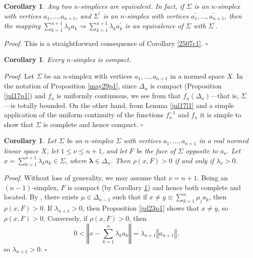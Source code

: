 \documentclass[11pt]{article}%
\newtheorem{corollary}[theorem]{Corollary}
\newenvironment{proof}[1][Proof]{\noindent\textit{#1.} }{}
\begin{document}
\begin{corollary}
\label{may30c1}Any two $n$-simplices are equivalent. In fact, if $\Sigma$ is
an $n$-simplex with vertices $a_{1},\ldots.a_{n+1}$, and $\Sigma^{\prime}$ is
an $n$-simplex with vertices $a_{1}^{\prime},\ldots,a_{n+1}^{\prime}$, then
the mapping $\sum_{k=1}^{n+1}\lambda_{k}a_{k}\rightsquigarrow\sum_{k=1}%
^{n+1}\lambda_{k}a_{k}^{\prime}$ is an equivalence of $\Sigma$ with
$\Sigma^{\prime}$.
\end{corollary}

\begin{proof}
This is a straightforward consequence of Corollary \ref{2507c1}\emph{.}%
\hfill
$\square$
\end{proof}

\begin{corollary}
\label{jul17c1}Every $n$-simplex is compact.
\end{corollary}

\begin{proof}
Let $\Sigma$ be an $n$-simplex with vertices $a_{1},\ldots,a_{n+1}$ in a
normed space $X$. In the notation of Proposition \ref{may29p1}, since
$\Delta_{n}$ is compact (Proposition \ref{jul17p1}) and $f_{n}$ is uniformly
continuous, we see from \cite[2.2.6]{BVtech} that $f_{n}(\Delta_{n})$---that
is, $\Sigma$---is totally bounded. On the other hand, from Lemma \ref{jul17l1}
and a simple application of the uniform continuity of the functions
$f_{n}^{-1}$ and $f_{n}$ it is simple to show that $\Sigma$ is complete and
hence compact.%
\hfill
$\square$
\end{proof}

\begin{corollary}
\label{jul23c1}Let $\Sigma$ be an $n$-simplex $\Sigma$ with vertices
$a_{1},\ldots,a_{n+1}$ in a real normed linear space $X$, let $1\leq\nu\leq
n+1$, and let $F$ be the face of $\Sigma$ opposite to $a_{\nu}$. Let
$x=\sum_{k=1}^{n+1}\lambda_{k}a_{k}\in\Sigma$, where $\mathbf{\lambda}%
\in\Delta_{n}$. Then $\rho(x,F)>0$ if and only if $\lambda_{\nu}>0$.
\end{corollary}

\begin{proof}
Without loss of generality, we may assume that $\nu=n+1$. Being an $\left(
n-1\right)  $-simplex, $F$ is compact (by Corollary \ref{jul17c1}) and hence
both complete and located. By \cite[3.3.1]{BVtech}, there exists $\mu\in
\Delta_{n-1}$ such that if $x\neq y\equiv\sum_{k=1}^{n}\mu_{j}a_{k}$, then
$\rho(x,F)>0$. If $\lambda_{n+1}>0$, then Proposition \ref{jul23p1} shows that
$x\neq y$, so $\rho(x,F)>0$. Conversely, if $\rho(x,F)>0$, then%
\[
0<\left\Vert x-\sum_{k=1}^{n}\lambda_{k}a_{k}\right\Vert =\lambda
_{n+1}\left\Vert a_{n+1}\right\Vert ,
\]
so $\lambda_{n+1}>0$.%
\hfill
$\square$
\end{proof}
\end{document}
